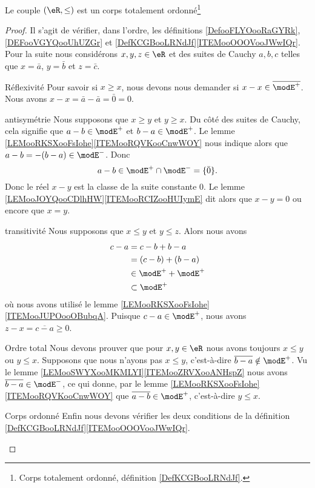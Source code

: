 \begin{proposition} \label{PROPooYMJVooNAsXae}
	Le couple \( (\eR,\leq)\) est un corps totalement ordonné\footnote{Corps totalement ordonné, définition \ref{DefKCGBooLRNdJf}.}
\end{proposition}

\begin{proof}
	Il s'agit de vérifier, dans l'ordre, les définitions \ref{DefooFLYOooRaGYRk}, \ref{DEFooVGYQooUhUZGr} et \ref{DefKCGBooLRNdJf}\ref{ITEMooOOOVooJWwIQr}. Pour la suite nous considérons \( x,y,z\in \eR\) et des suites de Cauchy \( a,b,c\) telles que \( x=\bar a\), \( y=\bar b\) et \( z=\bar c\).
	\begin{subproof}
		\item[Réflexivité]
		Pour savoir si \( x\geq x\), nous devons nous demander si \( x-x\in\overline{ \modE^+ }\). Nous avons \( x-x=\bar a-\bar a=\bar 0=0\).
		\item[antisymétrie]
		Nous supposons que \( x\geq y\) et \( y\geq x\). Du côté des suites de Cauchy, cela signifie que \( a-b\in\modE^+\) et \( b-a\in \modE^+\). Le lemme \ref{LEMooRKSXooFsIohe}\ref{ITEMooRQVKooCnwWOY} nous indique alors que \( a-b=-(b-a)\in \modE^-\). Donc
		\begin{equation}
			a-b\in\modE^+\cap\modE^-=\{ \bar 0 \}.
		\end{equation}
		Donc le réel \( x-y\) est la classe de la suite constante \( 0\). Le lemme \ref{LEMooJOYQooCDlhHW}\ref{ITEMooRCIZooHUIymE} dit alors que \( x-y=0\) ou encore que \( x=y\).
		\item[transitivité]
		Nous supposons que \( x\leq y\) et \( y\leq z\). Alors nous avons
		\begin{subequations}
			\begin{align}
				c-a & =c-b+b-a            \\
				    & =(c-b)+(b-a)        \\
				    & \in \modE^++\modE^+ \\
				    & \subset \modE^+
			\end{align}
		\end{subequations}
		où nous avons utilisé le lemme \ref{LEMooRKSXooFsIohe}\ref{ITEMooJUPOooOBubqA}. Puisque \( c-a\in\modE^+\), nous avons \( z-x=\overline{ c-a }\geq 0\).
		\item[Ordre total]
		Nous devons prouver que pour \( x,y\in \eR\) nous avons toujours \( x\leq y\) ou \( y\leq x\). Supposons que nous n'ayons pas \( x\leq y\), c'est-à-dire \( \overline{ b-a }\notin \modE^+\). Vu le lemme \ref{LEMooSWYXooMKMLYI}\ref{ITEMooZRVXooANHspZ} nous avons \( \overline{ b-a }\in \modE^-\), ce qui donne, par le lemme \ref{LEMooRKSXooFsIohe}\ref{ITEMooRQVKooCnwWOY} que \( \overline{ a-b }\in \modE^+\), c'est-à-dire \( y\leq x\).
		\item[Corps ordonné]
		Enfin nous devons vérifier les deux conditions de la définition \ref{DefKCGBooLRNdJf}\ref{ITEMooOOOVooJWwIQr}.


\end{subproof}
\end{proof}

